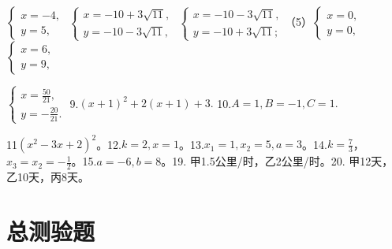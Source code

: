 \(\left\{ \begin{array}{l} x = -4, \\ y = 5, \end{array} \right.\) \(\left\{ \begin{array}{l} x = -10 + 3\sqrt{11}, \\ y = -10 - 3\sqrt{11}, \end{array} \right.\) \(\left\{ \begin{array}{l} x = -10 - 3\sqrt{11}, \\ y = -10 + 3\sqrt{11}; \end{array} \right.\)（5）\(\left\{ \begin{array}{l} x = 0, \\ y = 0, \end{array} \right.\) \(\left\{ \begin{array}{l} x = 6, \\ y = 9, \end{array} \right.\)

\(\left\{ \begin{array}{l} x = \frac{50}{21}, \\ y = -\frac{20}{21}. \end{array} \right.\)
9.\((x + 1)^2 + 2(x + 1) + 3.\) 10.\(A = 1, B = -1, C = 1.\)

11\((x^{2} - 3x + 2)^{2}\)。12.\(k = 2, x = 1\)。13.\(x_{1} = 1, x_{2} = 5, a = 3\)。14.\(k = \frac{7}{3}\)，\(x_{3} = x_{2} = -\frac{1}{2}\)。15.\(a = -6, b = 8\)。19.
甲1.5公里/时，乙2公里/时。20. 甲12天，乙10天，丙8天。

\section{总测验题}

